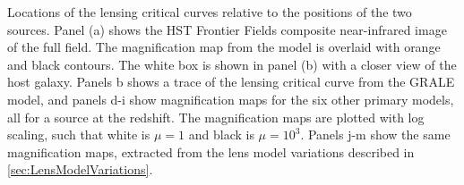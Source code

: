 \label{fig:SpockCriticalCurves}
Locations of the lensing critical curves relative to the positions of
the two \spock sources. Panel (a) shows the HST Frontier Fields
composite near-infrared image of the full  field.  The
magnification map from the \citet{Caminha:2017} model is overlaid with
orange and black contours.  The white box is shown in panel (b) with a
closer view of the \spock host galaxy.  Panels b shows a trace of the
lensing critical curve from the GRALE model, and panels d-i show
magnification maps for the six other primary models, all for a source
at the \spock redshift.  The magnification maps are plotted with log
scaling, such that white is $\mu=1$ and black is $\mu=10^3$.  Panels
j-m show the same magnification maps, extracted from the lens model
variations described in \ref{sec:LensModelVariations}. 
